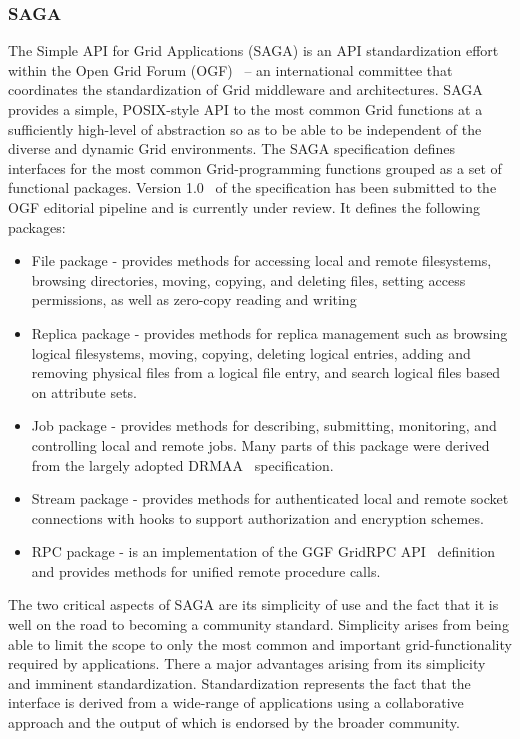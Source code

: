 \documentclass[conference,final]{IEEEtran}
\begin{document}
{\subsubsection{SAGA}

The Simple API for Grid Applications (SAGA) is an API standardization
effort within the Open Grid Forum (OGF)~\cite{ogf_web} -- an
international committee that coordinates the standardization of Grid
middleware and architectures. SAGA provides a simple, POSIX-style API
to the most common Grid functions at a sufficiently high-level of
abstraction so as to be able to be independent of the diverse and
dynamic Grid environments.  The SAGA specification defines interfaces
for the most common Grid-programming functions grouped as a set of
functional packages.  Version 1.0~\cite{saga-core} of the
specification has been submitted to the OGF editorial pipeline and is
currently under review.  It defines the following packages:

\begin{itemize}
\item File package - provides methods for accessing local and remote
  filesystems, browsing directories, moving, copying, and deleting
  files, setting access permissions, as well as zero-copy reading and
  writing
\item Replica package - provides methods for replica management such
  as browsing logical filesystems, moving, copying, deleting logical
  entries, adding and removing physical files from a logical file
  entry, and search logical files based on attribute sets.
\item Job package - provides methods for describing, submitting,
  monitoring, and controlling local and remote jobs. Many parts of
  this package were derived from the largely adopted
  DRMAA~\cite{drmaa_url} specification.
\item Stream package - provides methods for authenticated local and
  remote socket connections with hooks to support authorization and
  encryption schemes.
\item RPC package - is an implementation of the GGF GridRPC
  API~\cite{gridrpc_url} definition and provides methods for unified
  remote procedure calls.
\end{itemize}

The two critical aspects of SAGA are its simplicity of use and the
fact that it is well on the road to becoming a community standard.
Simplicity arises from being able to limit the scope to only the most
common and important grid-functionality required by applications.
There a major advantages arising from its simplicity and imminent
standardization.  Standardization represents the fact that the
interface is derived from a wide-range of applications using a
collaborative approach and the output of which is endorsed by the
broader community.

}
\end{document}
